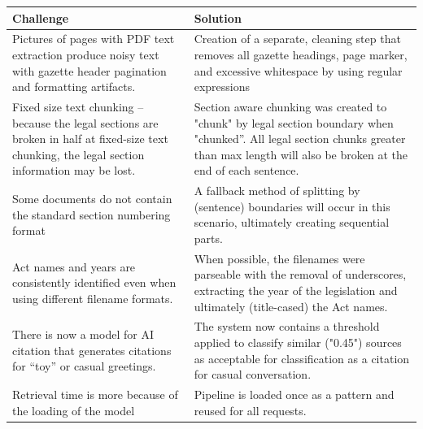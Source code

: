 \documentclass[12pt,a4paper]{article}
\begin{document}
\begin{table}[H]
\centering
\begin{tabular}{p{6.5cm} p{7cm}}
\toprule
\textbf{Challenge} & \textbf{Solution} \\
\midrule
Pictures of pages with PDF text extraction produce noisy text with gazette header pagination and formatting artifacts. &
Creation of a separate, cleaning step that removes all gazette headings, page marker, and excessive whitespace by using regular expressions \\

\addlinespace
Fixed size text chunking – because the legal sections are broken in half at fixed-size text chunking, the legal section information may be lost. &
Section aware chunking was created to "chunk" by legal section boundary when "chunked”. All legal section chunks greater than max length will also be broken at the end of each sentence. \\
\addlinespace
Some documents do not contain the standard section numbering format &
A fallback method of splitting by (sentence) boundaries will occur in this scenario, ultimately creating sequential parts.  \\

\addlinespace
Act names and years are consistently identified even when using different filename formats. &
When possible, the filenames were parseable with the removal of underscores, extracting the year of the legislation and ultimately (title-cased) the Act names.  \\

\addlinespace
There is now a model for AI citation that generates citations for “toy” or casual greetings. &
The system now contains a threshold applied to classify similar ("0.45") sources as acceptable for classification as a citation for casual conversation. \\

\addlinespace
Retrieval time is more because of the loading of the model &
Pipeline is loaded once as a pattern and reused for all requests. \\


\end{tabular}
\end{table}
\end{document}
